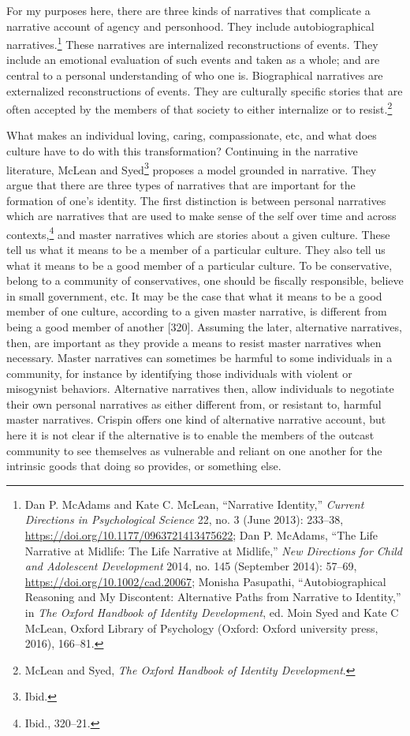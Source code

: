 \documentclass[phdthesis,12pt,final]{wuthesis}
\theoremstyle{definition}
\theoremstyle{definition}
\theoremstyle{definition}
\theoremstyle{definition}
\theoremstyle{remark}
\begin{document}
For my purposes here, there are three kinds of narratives that complicate a narrative account of agency and personhood. They include autobiographical narratives.\footnote{Dan P. McAdams and Kate C. McLean, {``Narrative {Identity},''} \emph{Current Directions in Psychological Science} 22, no. 3 (June 2013): 233--38, \url{https://doi.org/10.1177/0963721413475622}; Dan P. McAdams, {``The {Life Narrative} at {Midlife}: {The Life Narrative} at {Midlife},''} \emph{New Directions for Child and Adolescent Development} 2014, no. 145 (September 2014): 57--69, \url{https://doi.org/10.1002/cad.20067}; Monisha Pasupathi, {``Autobiographical {Reasoning} and {My} {Discontent}: {Alternative Paths} from {Narrative} to {Identity},''} in \emph{The {Oxford} Handbook of Identity Development}, ed. Moin Syed and Kate C McLean, Oxford Library of Psychology (Oxford: Oxford university press, 2016), 166--81.} These narratives are internalized reconstructions of events. They include an emotional evaluation of such events and taken as a whole; and are central to a personal understanding of who one is. Biographical narratives are externalized reconstructions of events. They are culturally specific stories that are often accepted by the members of that society to either internalize or to resist.\footnote{McLean and Syed, \emph{The {Oxford} Handbook of Identity Development}.}

What makes an individual loving, caring, compassionate, etc, and what does culture have to do with this transformation? Continuing in the narrative literature, McLean and Syed\footnote{Ibid.} proposes a model grounded in narrative. They argue that there are three types of narratives that are important for the formation of one's identity. The first distinction is between personal narratives which are narratives that are used to make sense of the self over time and across contexts,\footnote{Ibid., 320--21.} and master narratives which are stories about a given culture. These tell us what it means to be a member of a particular culture. They also tell us what it means to be a good member of a particular culture. To be conservative, belong to a community of conservatives, one should be fiscally responsible, believe in small government, etc. It may be the case that what it means to be a good member of one culture, according to a given master narrative, is different from being a good member of another {[}320{]}. Assuming the later, alternative narratives, then, are important as they provide a means to resist master narratives when necessary. Master narratives can sometimes be harmful to some individuals in a community, for instance by identifying those individuals with violent or misogynist behaviors. Alternative narratives then, allow individuals to negotiate their own personal narratives as either different from, or resistant to, harmful master narratives. Crispin offers one kind of alternative narrative account, but here it is not clear if the alternative is to enable the members of the outcast community to see themselves as vulnerable and reliant on one another for the intrinsic goods that doing so provides, or something else.
\end{document}
